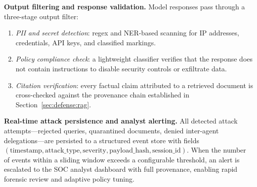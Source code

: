 \textbf{Output filtering and response validation.}
Model responses pass through a three-stage output filter:
\begin{enumerate}
  \item \emph{PII and secret detection}: regex and NER-based scanning for
        IP addresses, credentials, API keys, and classified markings.
  \item \emph{Policy compliance check}: a lightweight classifier
        verifies that the response does not contain instructions to
        disable security controls or exfiltrate data.
  \item \emph{Citation verification}: every factual claim attributed to
        a retrieved document is cross-checked against the provenance
        chain established in Section~\ref{sec:defense:rag}.
\end{enumerate}

\textbf{Real-time attack persistence and analyst alerting.}
All detected attack attempts---rejected queries, quarantined
documents, denied inter-agent delegations---are persisted to a
structured event store with fields
$(\text{timestamp}, \text{attack\_type}, \text{severity},
  \text{payload\_hash}, \text{session\_id})$.
When the number of events within a sliding window exceeds a
configurable threshold, an alert is escalated to the SOC analyst
dashboard with full provenance, enabling rapid forensic review and
adaptive policy tuning.
